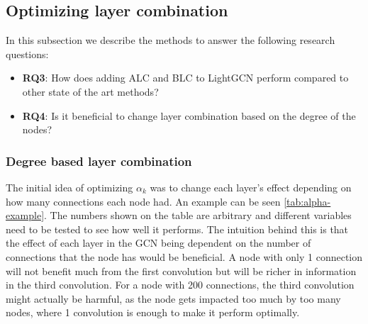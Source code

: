 \subsection{Optimizing layer combination}

In this subsection we describe the methods to answer the following research questions:
\begin{itemize}
    \item \textbf{RQ3}: How does adding ALC and BLC to LightGCN perform compared to other state of the art methods?
    \item \textbf{RQ4}: Is it beneficial to change layer combination based on the degree of the nodes?
\end{itemize}  

\subsubsection{Degree based layer combination}
The initial idea of optimizing $\alpha_k$ was to change each layer's effect depending on how many connections each node had.
An example can be seen \autoref{tab:alpha-example}.
The numbers shown on the table are arbitrary and different variables need to be tested to see how well it performs.
The intuition behind this is that the effect of each layer in the GCN being dependent on the number of connections that the node has would be beneficial.
A node with only 1 connection will not benefit much from the first convolution but will be richer in information in the third convolution.
For a node with 200 connections, the third convolution might actually be harmful, as the node gets impacted too much by too many nodes, where 1 convolution is enough to make it perform optimally.

